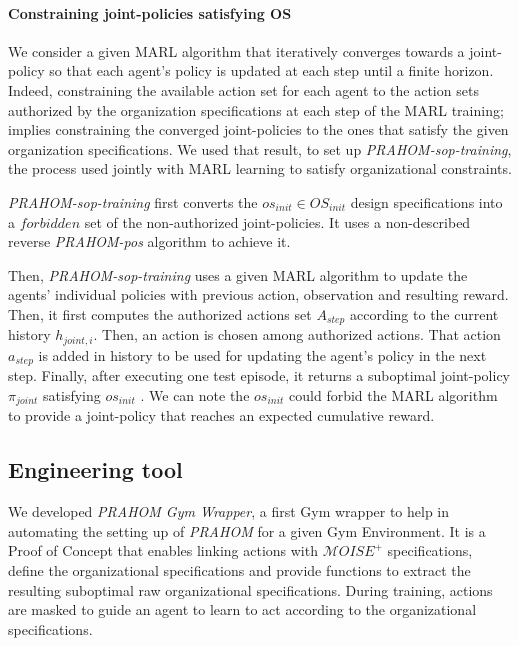 \documentclass[runningheads]{llncs}
\begin{document}
\paragraph{\textbf{Constraining joint-policies satisfying OS}}

We consider a given MARL algorithm that iteratively converges towards a joint-policy so that each agent's policy is updated at each step until a finite horizon. Indeed, constraining the available action set for each agent to the action sets authorized by the organization specifications at each step of the MARL training; implies constraining the converged joint-policies to the ones that satisfy the given organization specifications. We used that result, to set up \emph{PRAHOM-sop-training}, the process used jointly with MARL learning to satisfy organizational constraints.

\emph{PRAHOM-sop-training} first converts the $os_{init} \in OS_{init}$ design specifications into a $forbidden$ set of the non-authorized joint-policies. It uses a non-described reverse \emph{PRAHOM-pos} algorithm to achieve it.

Then, \emph{PRAHOM-sop-training} uses a given MARL algorithm to update the agents' individual policies with previous action, observation and resulting reward. Then, it first computes the authorized actions set $A_{step}$ according to the current history $h_{joint,i}$. Then, an action is chosen among authorized actions. That action $a_{step}$ is added in history to be used for updating the agent's policy in the next step.
Finally, after executing one test episode, it returns a suboptimal joint-policy $\pi_{joint}$ satisfying $os_{init}$
. We can note the $os_{init}$ could forbid the MARL algorithm to provide a joint-policy that reaches an expected cumulative reward.


\subsection{Engineering tool}

We developed \emph{PRAHOM Gym Wrapper}\label{gym-wrapper}, a first Gym wrapper to help in automating the setting up of \emph{PRAHOM} for a given Gym Environment.
It is a Proof of Concept that enables linking actions with $\mathcal{M}OISE^+$ specifications, define the organizational specifications and provide functions to extract the resulting suboptimal raw organizational specifications. During training, actions are masked to guide an agent to learn to act according to the organizational specifications.
\end{document}

